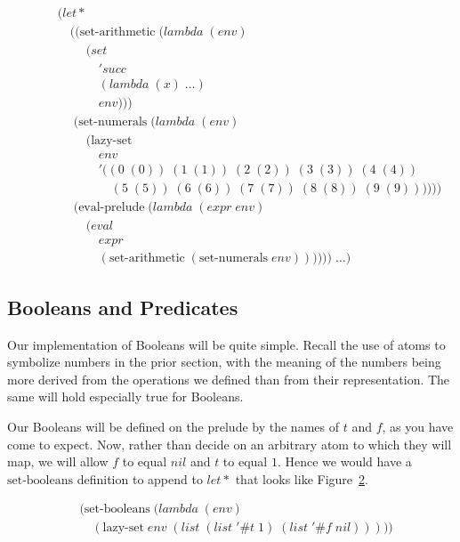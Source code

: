 \begin{figure}[htp]
\caption{}\label{fig:evalPreludeExtension}
\begin{align*}
& (let* \; 
\\& \quad ((\text{set-arithmetic} \; (lambda \; (env)
\\& \qquad \; (set
\\& \qquad \quad \; 'succ
\\& \qquad \quad \; (lambda \; (x) \; \dots)
\\& \qquad \quad \; env)))
\\& \quad \; (\text{set-numerals} \; (lambda \; (env) \; 
\\& \qquad \; (\text{lazy-set} \; 
\\& \qquad \quad \; env \; 
\\& \qquad \quad \; '((0 \; (0)) \; (1 \; (1)) \; (2 \; (2)) \; (3 \; (3)) \; (4 \; (4)) \; 
\\& \qquad \qquad \; (5 \; (5)) \; (6 \; (6)) \; (7 \; (7)) \; (8 \; (8)) \; (9 \; (9))))))
\\& \quad \; (\text{eval-prelude} \; (lambda \; (expr \; env)
\\& \qquad \; (eval \; 
\\& \qquad \quad \; expr
\\& \qquad \quad \; (\text{set-arithmetic} \; (\text{set-numerals} \; env)))))) \; \dots)
\end{align*}
\end{figure}

\subsection{Booleans and Predicates}
Our implementation of Booleans will be quite simple. Recall the use of atoms 
to symbolize numbers in the prior section, with the meaning of the numbers 
being more derived from the operations we defined than from their 
representation. The same will hold especially true for Booleans.

Our Booleans will be defined on the prelude by the names of $t$ and $f$, as 
you have come to expect. Now, rather than decide on an arbitrary atom to 
which they will map, we will allow $f$ to equal $nil$ and $t$ to equal $1$. 
Hence we would have a $\text{set-booleans}$ definition to append to $let*$ that 
looks like Figure~\ref{fig:setBooleansDef}.

\begin{figure}[htp]
\caption{}\label{fig:setBooleansDef}
\begin{align*}
& (\text{set-booleans} \; (lambda \; (env)
\\& \quad (\text{lazy-set} \; env \; (list \; (list \; '\#t \; 1) \; (list \; '\#f \; nil)))))
\end{align*}
\end{figure}

